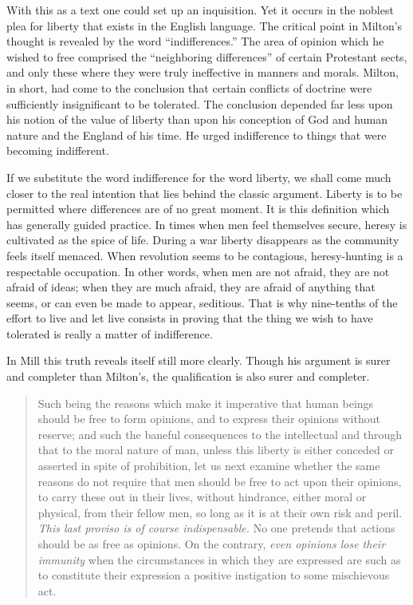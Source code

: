 \documentclass[openany,nobib,nohyper]{tufte-book}
\begin{document}
With this as a text one could set up an inquisition. Yet it occurs in
the noblest plea for liberty that exists in the English language. The
critical point in Milton's thought is revealed by the word
``indifferences.'' The area of opinion which he wished to free comprised
the ``neighboring differences'' of certain Protestant sects, and only
these where they were truly ineffective in manners and morals. Milton,
in short, had come to the conclusion that certain conflicts of doctrine
were sufficiently insignificant to be tolerated. The conclusion depended
far less upon his notion of the value of liberty than upon his
conception of God and human nature and the England of his time. He urged
indifference to things that were becoming indifferent.

If we substitute the word indifference for the word liberty, we shall
come much closer to the real intention that lies behind the classic
argument. Liberty is to be permitted where differences are of no great
moment. It is this definition which has generally guided practice. In
times when men feel themselves secure, heresy is cultivated as the spice
of life. During a war liberty disappears as the community feels itself
menaced. When revolution seems to be contagious, heresy-hunting is a
respectable occupation. In other words, when men are not afraid, they
are not afraid of ideas; when they are much afraid, they are afraid of
anything that seems, or can even be made to appear, seditious. That is
why nine-tenths of the effort to live and let live consists in proving
that the thing we wish to have tolerated is really a matter of
indifference.

In Mill this truth reveals itself still more clearly. Though his
argument is surer and completer than Milton's, the qualification is also
surer and completer.

\begin{quote}
Such being the reasons which make it imperative that human beings should
be free to form opinions, and to express their opinions without reserve;
and such the baneful consequences to the intellectual and through that
to the moral nature of man, unless this liberty is either conceded or
asserted in spite of prohibition, let us next examine whether the same
reasons do not require that men should be free to act upon their
opinions, to carry these out in their lives, without hindrance, either
moral or physical, from their fellow men, so long as it is at their own
risk and peril. \emph{This last proviso is of course indispensable.} No
one pretends that actions should be as free as opinions. On the
contrary, \emph{even opinions lose their immunity} when the
circumstances in which they are expressed are such as to constitute
their expression a positive instigation to some mischievous act.
\end{quote}
\end{document}
